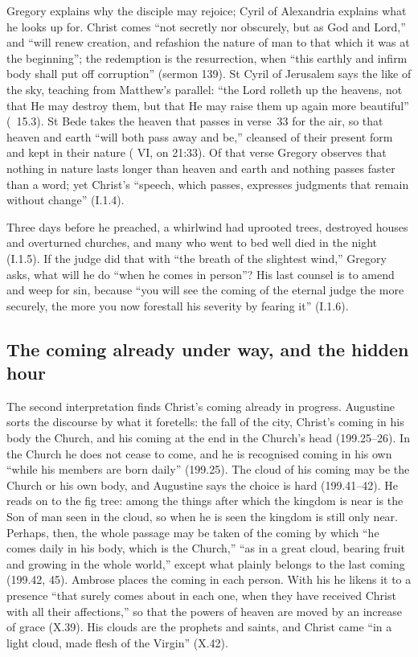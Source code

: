 Gregory explains why the disciple may rejoice; Cyril of Alexandria explains
what he looks up for. Christ comes ``not secretly nor obscurely, but as God
and Lord,'' and ``will renew creation, and refashion the nature of man to that
which it was at the beginning''; the redemption is the resurrection, when
``this earthly and infirm body shall put off corruption'' (sermon 139). St
Cyril of Jerusalem says the like of the sky, teaching from Matthew's parallel:
``the Lord rolleth up the heavens, not that He may destroy them, but that He
may raise them up again more beautiful'' (~15.3). St Bede takes the
heaven that passes in verse~33 for the air, so that heaven and earth ``will
both pass away and be,'' cleansed of their present form and kept in their
nature ( VI, on 21:33). Of that verse Gregory observes that
nothing in nature lasts longer than heaven and earth and nothing passes faster
than a word; yet Christ's ``speech, which passes, expresses judgments that
remain without change'' (I.1.4).

Three days before he preached, a whirlwind had uprooted trees, destroyed
houses and overturned churches, and many who went to bed well died in the
night (I.1.5). If the judge did that with ``the breath of the slightest
wind,'' Gregory asks, what will he do ``when he comes in person''? His last
counsel is to amend and weep for sin, because ``you will see the coming of the
eternal judge the more securely, the more you now forestall his severity by
fearing it'' (I.1.6).

\subsection{The coming already under way, and the hidden hour}

The second interpretation finds Christ's coming already in progress.
Augustine sorts the discourse by what it foretells: the fall of the city,
Christ's coming in his body the Church, and his coming at the end in the
Church's head (199.25--26). In the Church he does not cease to come, and he is
recognised coming in his own ``while his members are born daily'' (199.25).
The cloud of his coming may be the Church or his own body, and Augustine says
the choice is hard (199.41--42). He reads on to the fig tree: among the things
after which the kingdom is near is the Son of man seen in the cloud, so when
he is seen the kingdom is still only near. Perhaps, then, the whole passage
may be taken of the coming by which ``he comes daily in his body, which is the
Church,'' ``as in a great cloud, bearing fruit and growing in the whole
world,'' except what plainly belongs to the last coming (199.42, 45). Ambrose
places the coming in each person. With his  he likens it to a
presence ``that surely comes about in each one, when they have received Christ
with all their affections,'' so that the powers of heaven are moved by an
increase of grace (X.39). His clouds are the prophets and saints, and Christ
came ``in a light cloud, made flesh of the Virgin'' (X.42).

